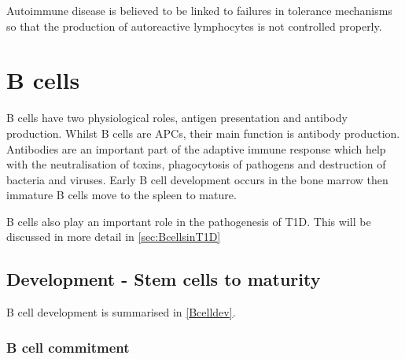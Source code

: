 Autoimmune disease is believed to be linked to failures in tolerance mechanisms so that the production of autoreactive lymphocytes is not controlled properly.

\section{B cells}
\label{sec:Bcells}

B cells have two physiological roles, antigen presentation and antibody production.
Whilst B cells are APCs, their main function is antibody production.
Antibodies are an important part of the adaptive immune response which help with the neutralisation of toxins, phagocytosis of pathogens and destruction of bacteria and viruses.
Early B cell development occurs in the bone marrow then immature B cells move to the spleen to mature.

B cells also play an important role in the pathogenesis of T1D. 
This will be discussed in more detail in \cref{sec:BcellsinT1D}

\subsection{Development - Stem cells to maturity}
\label{subsec:Bcelldevelopment}

B cell development is summarised in \cref{Bcelldev}.
\subsubsection{B cell commitment}




